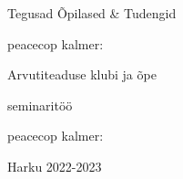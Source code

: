\begin{titlepage}
\par{Tegusad Õpilased \& Tudengid}
\vspace{0.3\textheight}
\par{peacecop kalmer:}
\LARGE
\par{Arvutiteaduse klubi ja õpe}
\normalsize
\par{seminaritöö}
\vspace{0.3\textheight}
\begin{flushright}
\par{peacecop kalmer:}
\end{flushright}
\vfill
Harku
\hfill
2022-2023
\end{titlepage}
